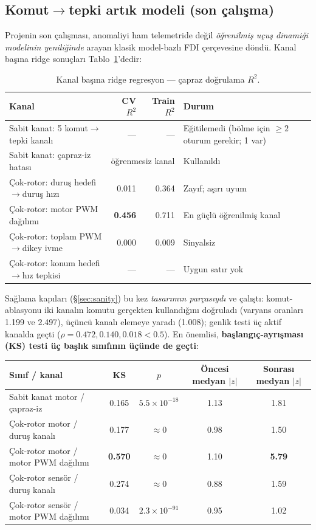 \documentclass[11pt,a4paper]{article}
\begin{document}
\subsection{Komut$\to$tepki artık modeli (son çalışma)}
\label{sec:residual-sonuc}

Projenin son çalışması, anomaliyi ham telemetride değil \emph{öğrenilmiş uçuş
dinamiği modelinin yeniliğinde} arayan klasik model-bazlı FDI çerçevesine
döndü. Kanal başına ridge sonuçları Tablo~\ref{tab:ridge}'dedir:

\begin{table}[h]
\centering\small
\caption{Kanal başına ridge regresyon --- çapraz doğrulama $R^2$.}
\label{tab:ridge}
\begin{tabular}{p{5.6cm}rrp{4.6cm}}
\toprule
Kanal & CV $R^2$ & Train $R^2$ & Durum \\
\midrule
Sabit kanat: 5 komut$\to$tepki kanalı & --- & --- & Eğitilemedi (bölme için
$\geq 2$ oturum gerekir; 1 var) \\
Sabit kanat: çapraz-iz hatası & \multicolumn{2}{c}{öğrenmesiz kanal} &
Kullanıldı \\
Çok-rotor: duruş hedefi$\to$duruş hızı & 0.011 & 0.364 & Zayıf; aşırı uyum \\
Çok-rotor: motor PWM dağılımı & \textbf{0.456} & 0.711 & En güçlü öğrenilmiş
kanal \\
Çok-rotor: toplam PWM$\to$dikey ivme & 0.000 & 0.009 & Sinyalsiz \\
Çok-rotor: konum hedefi$\to$hız tepkisi & --- & --- & Uygun satır yok \\
\bottomrule
\end{tabular}
\end{table}

Sağlama kapıları (\S\ref{sec:sanity}) bu kez \emph{tasarımın parçasıydı} ve
çalıştı: komut-ablasyonu iki kanalın komutu gerçekten kullandığını doğruladı
(varyans oranları 1.199 ve 2.497), üçüncü kanalı elemeye yaradı (1.008);
genlik testi üç aktif kanalda geçti ($\rho = 0.472, 0.140, 0.018 < 0.5$).
En önemlisi, \textbf{başlangıç-ayrışması (KS) testi üç başlık sınıfının
üçünde de geçti}:

\begin{center}
\small
\setlength{\tabcolsep}{4pt}
\begin{tabular}{lcccc}
\toprule
Sınıf / kanal & KS & $p$ & Öncesi medyan $|z|$ & Sonrası medyan $|z|$ \\
\midrule
Sabit kanat motor / çapraz-iz & 0.165 & $5.5\times10^{-18}$ & 1.13 & 1.81 \\
Çok-rotor motor / duruş kanalı & 0.177 & $\approx 0$ & 0.98 & 1.50 \\
Çok-rotor motor / motor PWM dağılımı & \textbf{0.570} & $\approx 0$ & 1.10 &
\textbf{5.79} \\
Çok-rotor sensör / duruş kanalı & 0.274 & $\approx 0$ & 0.88 & 1.59 \\
Çok-rotor sensör / motor PWM dağılımı & 0.034 & $2.3\times10^{-91}$ & 0.95 &
1.02 \\
\bottomrule
\end{tabular}
\end{center}
\end{document}
